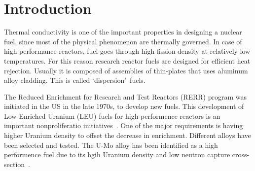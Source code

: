 \section{Introduction}
\begin{doublespacing}
Thermal conductivity is one of the important properties in designing a nuclear fuel, since most of the physical phenomenon are thermally governed. In case of high-performance reactors, fuel goes through high fission density at relatively low temperatures. For this reason research reactor fuels are designed for efficient heat rejection. Usually it is composed of assemblies of thin-plates that uses aluminum alloy cladding. This is called \lq dispersion\rq\ fuels.

The Reduced Enrichment for Research and Test Reactors (RERR) program was initiated in the US in the late 1970s, to develop new fuels. This development of Low-Enriched Uranium (LEU) fuels for high-performence reactors is an important nonproliferatio initiatives~\cite{snelgrove1997development}. One of the major requirements is having higher Uranium density to offset the decrease in enrichment. Different alloys have been selected and tested. The U-Mo alloy has been identified as a high performence fuel due to its hgih Uranium density and low neutron capture cross-section~\cite{ewh2010microstructural,smirnova2013ternary,rest2009analysis,landa2013density}.

\end{doublespacing}




